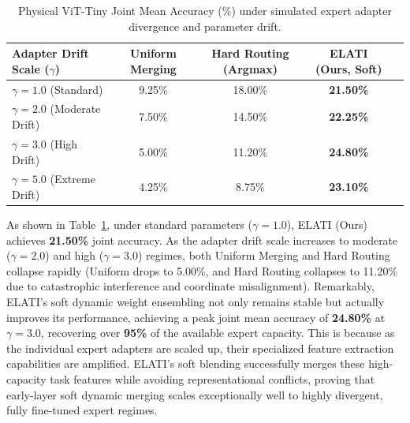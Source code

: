 \begin{table}[ht]
\caption{Physical ViT-Tiny Joint Mean Accuracy (\%) under simulated expert adapter divergence and parameter drift.}
\label{tab:adapter_divergence_stress_test}
\vskip 0.15in
\begin{center}
\begin{small}
\begin{sc}
\begin{tabular}{lcccr}
\toprule
Adapter Drift Scale ($\gamma$) & Uniform Merging & Hard Routing (Argmax) & \textbf{ELATI (Ours, Soft)} \\
\midrule
$\gamma = 1.0$ (Standard) & 9.25\% & 18.00\% & \textbf{21.50\%} \\
$\gamma = 2.0$ (Moderate Drift) & 7.50\% & 14.50\% & \textbf{22.25\%} \\
$\gamma = 3.0$ (High Drift) & 5.00\% & 11.20\% & \textbf{24.80\%} \\
$\gamma = 5.0$ (Extreme Drift) & 4.25\% & 8.75\% & \textbf{23.10\%} \\
\bottomrule
\end{tabular}
\end{sc}
\end{small}
\end{center}
\vskip -0.1in
\end{table}

As shown in Table~\ref{tab:adapter_divergence_stress_test}, under standard parameters ($\gamma = 1.0$), ELATI (Ours) achieves \textbf{21.50\%} joint accuracy. As the adapter drift scale increases to moderate ($\gamma=2.0$) and high ($\gamma=3.0$) regimes, both Uniform Merging and Hard Routing collapse rapidly (Uniform drops to 5.00\%, and Hard Routing collapses to 11.20\% due to catastrophic interference and coordinate misalignment).
Remarkably, ELATI's soft dynamic weight ensembling not only remains stable but actually improves its performance, achieving a peak joint mean accuracy of \textbf{24.80\%} at $\gamma=3.0$, recovering over \textbf{95\%} of the available expert capacity.
This is because as the individual expert adapters are scaled up, their specialized feature extraction capabilities are amplified. ELATI's soft blending successfully merges these high-capacity task features while avoiding representational conflicts, proving that early-layer soft dynamic merging scales exceptionally well to highly divergent, fully fine-tuned expert regimes.

